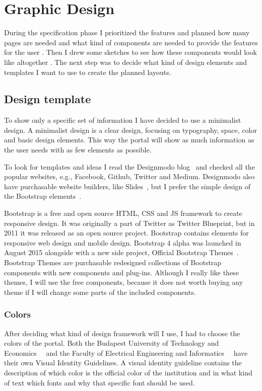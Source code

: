 \chapter{Graphic Design}\label{graphic-design}
During the specification phase I prioritized the features and planned how many pages are needed and what kind of components are needed to provide the features for the user . Then I drew some sketches to see how these components would look like altogether . The next step was to decide what kind of design elements and templates I want to use to create the planned layouts.

\section{Design template}

To show only a specific set of information I have decided to use a minimalist design. A minimalist design is a clear design, focusing on typography, space, color and basic design elements. This way the portal will show as much information as the user needs with as few elements as possible. 

To look for templates and ideas I read the Designmodo blog~\cite{Designmodo} and checked all the popular websites, e.g., Facebook, Github, Twitter and Medium. Designmodo also have purchasable website builders, like Slides~\cite{Designmodo-slides}, but I prefer the simple design of the Bootstrap elements~\cite{Bootstrap}. 

Bootstrap is a free and open source HTML, CSS and JS framework to create responsive design. It was originally a part of Twitter as Twitter Blueprint, but in 2011 it was released as an open source project. Bootstrap contains elements for responsive web design and mobile design. Bootstrap 4 alpha was launched in August 2015 alongside with a new side project, Official Bootstrap Themes~\cite{Bootstrap-themes}. Bootstrap Themes are purchasable redesigned collections of Bootstrap components with new components and plug-ins. Although I really like these themes, I will use the free components, because it does not worth buying any theme if I will change some parts of the included components. 

\subsection{Colors}

After deciding what kind of design framework will I use, I had to choose the colors of the portal. Both the Budapest University of Technology and Economics~\cite{BME-Arculat}~\cite{BME-Arculat-Intranet} and the Faculty of Electrical Engineering and Informatics~\cite{VIK-Arculat}~\cite{VIK-Arculat-PDF} have their own Visual Identity Guidelines. A visual identity guideline contains the description of which color is the official color of the institution and in what kind of text which fonts and why that specific font should be used.

